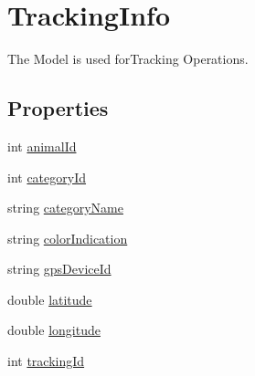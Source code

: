 \hypertarget{classWildlifeTrackingApp_1_1Models_1_1TrackingInfo}{}\section{Tracking\+Info}
\label{classWildlifeTrackingApp_1_1Models_1_1TrackingInfo}


The Model is used for\+Tracking Operations.  


\subsection*{Properties}
\begin{DoxyCompactItemize}
\item 
int \hyperlink{classWildlifeTrackingApp_1_1Models_1_1TrackingInfo_a99787b9867ae390df467a99040589a55}{animal\+Id}
\item 
int \hyperlink{classWildlifeTrackingApp_1_1Models_1_1TrackingInfo_a423f91c56dc35040d661cfbe357f7c78}{category\+Id}
\item 
string \hyperlink{classWildlifeTrackingApp_1_1Models_1_1TrackingInfo_a1eca787c85e1bc45b49bbd281d4106fd}{category\+Name}
\item 
string \hyperlink{classWildlifeTrackingApp_1_1Models_1_1TrackingInfo_a0ecdefcc99a4b41b1ef3a04167756366}{color\+Indication}
\item 
string \hyperlink{classWildlifeTrackingApp_1_1Models_1_1TrackingInfo_a073b88a9702ca0513fa534f58a048070}{gps\+Device\+Id}
\item 
double \hyperlink{classWildlifeTrackingApp_1_1Models_1_1TrackingInfo_a76714bdbc5c536fa77dfb14533ff82a9}{latitude}
\item 
double \hyperlink{classWildlifeTrackingApp_1_1Models_1_1TrackingInfo_ac155e35fdeebafc89723a51520fb9fe6}{longitude}
\item 
int \hyperlink{classWildlifeTrackingApp_1_1Models_1_1TrackingInfo_a7291076f1fbf1ead00eb6c30cf33d943}{tracking\+Id}
\end{DoxyCompactItemize}


